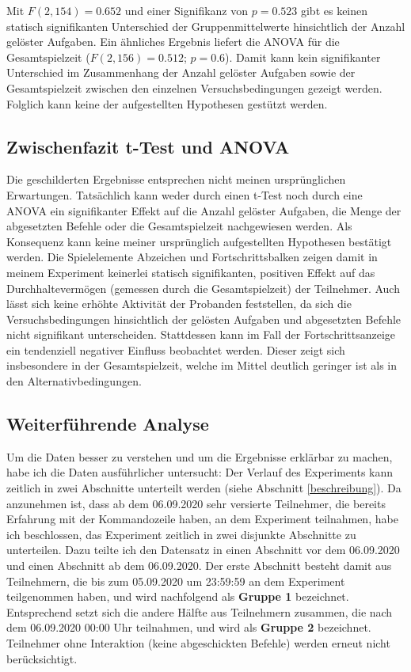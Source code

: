 Mit $F(2,154) = 0.652$ und einer Signifikanz von $p=0.523$ gibt es keinen statisch signifikanten Unterschied der Gruppenmittelwerte hinsichtlich der Anzahl gelöster Aufgaben. Ein ähnliches Ergebnis liefert die ANOVA für die Gesamtspielzeit ($F(2, 156)=0.512$; $p=0.6$). Damit kann kein signifikanter Unterschied im Zusammenhang der Anzahl gelöster Aufgaben sowie der Gesamtspielzeit zwischen den einzelnen Versuchsbedingungen gezeigt werden. Folglich kann keine der aufgestellten Hypothesen gestützt werden.


\subsection{Zwischenfazit t-Test und ANOVA}
Die geschilderten Ergebnisse entsprechen nicht meinen ursprünglichen Erwartungen. Tatsächlich kann weder durch einen t-Test noch durch eine ANOVA ein signifikanter Effekt auf die Anzahl gelöster Aufgaben, die Menge der abgesetzten Befehle oder die Gesamtspielzeit nachgewiesen werden. Als Konsequenz kann keine meiner ursprünglich aufgestellten Hypothesen bestätigt werden. Die Spielelemente Abzeichen und Fortschrittsbalken zeigen damit in meinem Experiment keinerlei statisch signifikanten, positiven Effekt auf das Durchhaltevermögen (gemessen durch die Gesamtspielzeit) der Teilnehmer. Auch lässt sich keine erhöhte Aktivität der Probanden feststellen, da sich die Versuchsbedingungen hinsichtlich der gelösten Aufgaben und abgesetzten Befehle nicht signifikant unterscheiden. Stattdessen kann im Fall der Fortschrittsanzeige ein tendenziell negativer Einfluss beobachtet werden. Dieser zeigt sich insbesondere in der Gesamtspielzeit, welche im Mittel deutlich geringer ist als in den Alternativbedingungen. 

\subsection{Weiterführende Analyse}
Um die Daten besser zu verstehen und um die Ergebnisse erklärbar zu machen, habe ich die Daten ausführlicher untersucht: Der Verlauf des Experiments kann zeitlich in zwei Abschnitte unterteilt werden (siehe Abschnitt \ref{beschreibung}). Da anzunehmen ist, dass ab dem 06.09.2020 sehr versierte Teilnehmer, die bereits Erfahrung mit der Kommandozeile haben, an dem Experiment teilnahmen, habe ich beschlossen, das Experiment zeitlich in zwei disjunkte Abschnitte zu unterteilen. Dazu teilte ich den Datensatz in einen Abschnitt vor dem 06.09.2020 und einen Abschnitt ab dem 06.09.2020. Der erste Abschnitt besteht damit aus Teilnehmern, die bis zum 05.09.2020 um 23:59:59 an dem Experiment teilgenommen haben, und wird nachfolgend als \textbf{Gruppe 1} bezeichnet. Entsprechend setzt sich die andere Hälfte aus Teilnehmern zusammen, die nach dem 06.09.2020 00:00 Uhr teilnahmen, und wird als \textbf{Gruppe 2} bezeichnet. Teilnehmer ohne Interaktion (keine abgeschickten Befehle) werden erneut nicht berücksichtigt.

